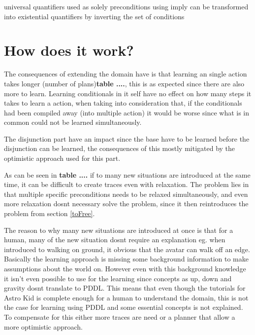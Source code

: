 	
	universal quantifiers used as solely preconditions using imply can be transformed into existential quantifiers by inverting the set of conditions

	
\section{How does it work?}	
	The consequences of extending the domain have is that learning an single action takes longer (number of plans)\textbf{table ....}, this is as expected since there are also more to learn. Learning conditionals in it self have no effect on how many steps it takes to learn a action, when taking into consideration that, if the conditionals had been compiled away (into multiple action) it would be worse since what is in common could not be learned simultaneously.
	
	The disjunction part have an impact since the base have to be learned before the disjunction can be learned, the consequences of this mostly mitigated by the optimistic approach used for this part.
	
	

	
	As can be seen in \textbf{table ....} if to many new situations are introduced at the same time, it can be difficult to create traces even with relaxation. The problem lies in that multiple specific preconditions needs to be relaxed simultaneously, and even more relaxation dosnt necessary solve the problem, since it then reintroduces the problem from section \ref{toFree}.
	
	The reason to why many new situations are introduced at once is that for a human, many of the new situation dosnt require an explanation eg. when introduced to walking on ground, it obvious that the avatar can walk off an edge. Basically the learning approach is missing some background information to make assumptions about the world on. However even with this background knowledge it isn't even possible to use for the learning since concepts as up, down and gravity dosnt translate to PDDL. This means that even though the tutorials for Astro Kid is complete enough for a human to understand the domain, this is not the case for learning using PDDL and some essential concepts is not explained. To compensate for this either more traces are need or a planner that allow a more optimistic approach.
	
	
